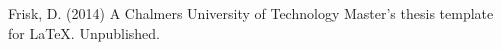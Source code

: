 \begin{thebibliography}{69}

 Frisk, D. (2014) A Chalmers University of Technology Master's thesis template for \LaTeX . Unpublished.

\end{thebibliography}
